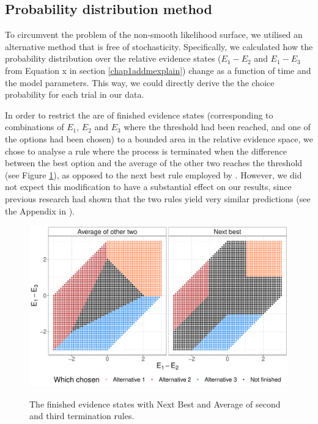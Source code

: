 \documentclass[11pt,a4paper]{article}
\begin{document}
\subsection{Probability distribution method}

To circumvent the problem of the non-smooth likelihood surface, we utilised an alternative method that is free of stochasticity. Specifically, we calculated how the probability distribution over the relative evidence states ($E_{1}-E_{2}$ and $E_{1}-E_{3}$ from Equation x in section \ref{chap1addmexplain}) change as a function of time and the model parameters. This way, we could directly derive the the choice probability for each trial in our data.

In order to restrict the are of finished evidence states (corresponding to combinations of $E_{1}$, $E_{2}$ and $E_{3}$ where the threshold had been reached, and one of the options had been chosen) to a bounded area in the relative evidence space, we chose to analyse a rule where the process is terminated when the difference between the best option and the average of the other two reaches the threshold (see Figure \ref{fig:rulesfinished}), as opposed to the next best rule employed by \citeauthor{Krajbich2011}. However, we did not expect this modification to have a substantial effect on our results, since previous research had shown that the two rules yield very similar predictions (see the Appendix in \citeauthor{Krajbich2011}).

\begin{figure}
\captionsetup{justification=centering}
\centering
\caption{The finished evidence states with Next Best and Average of second and third termination rules.}
\includegraphics[width=1\textwidth]{rulesfinished.pdf}
\label{fig:rulesfinished}
\end{figure}
\end{document}

